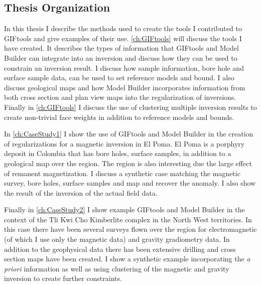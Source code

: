 \begin{itemize}
\begin{itemize}
\section{Thesis Organization}
\label{sec:Thesis Organization}
		
In this thesis I describe the methods used to create the tools I contributed to GIFtools and give examples of their use. \autoref{ch:GIFtools} will discuss the tools I have created. It  describes the types of information that GIFtools and Model Builder can integrate into an inversion and discuss how they can be used to constrain an inversion result. I discuss how sample information, bore hole and surface sample data, can be used to set reference models and bound. I also discuss geological maps and how Model Builder incorporates information from both cross section and plan view maps into the regularization of inversions. Finally in \autoref{ch:GIFtools}  I discuss the use of clustering multiple inversion results to create non-trivial face weights in addition to reference models and bounds.

In \autoref{ch:CaseStudy1} I show the use of GIFtools and Model Builder in the creation of regularizations for a magnetic inversion in El Poma. El Poma is a porphyry deposit in Colombia that has bore holes, surface samples, in addition to a geological map over the region. The region is also interesting due the large effect of remanent magnetization. I discuss a synthetic case matching the magnetic survey, bore holes, surface samples and map and recover the anomaly. I also show the result of the inversion of the actual field data.

Finally in \autoref{ch:CaseStudy2} I show example GIFtools and Model Builder in the context of the Tli Kwi Cho Kimberlite complex in the North West territories. In this case there have been several surveys flown over the region for electromagnetic (of which I use only the magnetic data) and gravity gradiometry data. In addition to the geophysical data there has been extensive drilling and cross section maps have been created. I show a synthetic example incorporating the \emph{a priori} information as well as using clustering of the magnetic and gravity inversion to create further constraints.


\end{itemize}
\end{itemize}





\endinput

 Interestingly, the assumption that all magnetizations are in the same direction also assumes that all Koenigsberger ratios are equal.

Any text after an \endinput is ignored.
You could put scraps here or things in progress.
